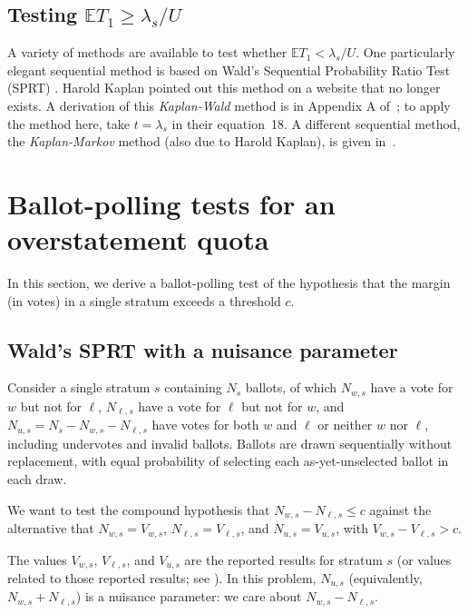 \documentclass[runningheads]{llncs}
\begin{document}
\subsection{Testing $\mathbb{E} T_1 \ge \lambda_s/U$}

A variety of methods are available to test whether $\mathbb{E} T_1 < \lambda_s/U$.
One particularly elegant sequential method is based on Wald's Sequential Probability
Ratio Test (SPRT) \cite{wald45}.
Harold Kaplan pointed out this method on a website that no longer exists.
A derivation of this \emph{Kaplan-Wald} method is in Appendix A of~\cite{starkTeague14};
to apply the method here, take $t = \lambda_s$ in their equation~18.
A different sequential method, the \emph{Kaplan-Markov} method (also due to Harold Kaplan), 
is given in~\cite{stark09b}.


\section{Ballot-polling tests for an overstatement quota}\label{sec:appendix-polling}
In this section, we derive a ballot-polling test of the hypothesis that the margin (in votes) in a single stratum exceeds a threshold $c$. 

\subsection{Wald's SPRT with a nuisance parameter}

Consider a single stratum $s$ containing $N_s$ ballots, of which 
$N_{w,s}$ have a vote for $w$ but not for $\ell$, $N_{\ell,s}$ have a vote for $\ell$ but not for $w$, and $N_{u,s} = N_s - N_{w,s} - N_{\ell,s}$ have votes for both $w$ and $\ell$ or neither $w$ nor $\ell$, including undervotes and invalid ballots.
Ballots are drawn sequentially without replacement, with equal probability of selecting each as-yet-unselected ballot in each draw.

We want to test the compound hypothesis that $N_{w,s} - N_{\ell,s} \le c$ against the alternative that $N_{w,s} = V_{w,s}$, $N_{\ell,s} = V_{\ell,s}$, and $N_{u,s} = V_{u,s}$, with $V_{w,s} - V_{\ell,s} > c$.

The values $V_{w,s}$, $V_{\ell,s}$, and $V_{u,s}$ are the reported results for stratum $s$ 
(or values related to those reported results; see \cite{lindemanEtal12}). 
In this problem, $N_{u,s}$ (equivalently, $N_{w,s} + N_{\ell,s}$) is a nuisance parameter: we care about $ N_{w,s} - N_{\ell,s}$.
\end{document}
